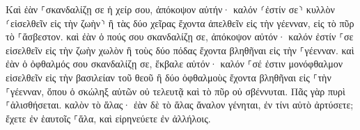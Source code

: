 \documentclass{openreader}
\begin{document}
Καὶ ἐὰν ⸀σκανδαλίζῃ σε ἡ χείρ σου, ἀπόκοψον αὐτήν· καλόν ⸂ἐστίν σε⸃ κυλλὸν ⸂εἰσελθεῖν εἰς τὴν ζωὴν⸃ ἢ τὰς δύο χεῖρας ἔχοντα ἀπελθεῖν εἰς τὴν γέενναν, εἰς τὸ πῦρ τὸ ⸀ἄσβεστον. 
καὶ ἐὰν ὁ πούς σου σκανδαλίζῃ σε, ἀπόκοψον αὐτόν· καλόν ἐστίν ⸀σε εἰσελθεῖν εἰς τὴν ζωὴν χωλὸν ἢ τοὺς δύο πόδας ἔχοντα βληθῆναι εἰς τὴν ⸀γέενναν. 
καὶ ἐὰν ὁ ὀφθαλμός σου σκανδαλίζῃ σε, ἔκβαλε αὐτόν· καλόν ⸀σέ ἐστιν μονόφθαλμον εἰσελθεῖν εἰς τὴν βασιλείαν τοῦ θεοῦ ἢ δύο ὀφθαλμοὺς ἔχοντα βληθῆναι εἰς ⸀τὴν ⸀γέενναν, 
ὅπου ὁ σκώληξ αὐτῶν οὐ τελευτᾷ καὶ τὸ πῦρ οὐ σβέννυται. 
Πᾶς γὰρ πυρὶ ⸀ἁλισθήσεται. 
καλὸν τὸ ἅλας· ἐὰν δὲ τὸ ἅλας ἄναλον γένηται, ἐν τίνι αὐτὸ ἀρτύσετε; ἔχετε ἐν ἑαυτοῖς ⸀ἅλα, καὶ εἰρηνεύετε ἐν ἀλλήλοις. 
\end{document}
